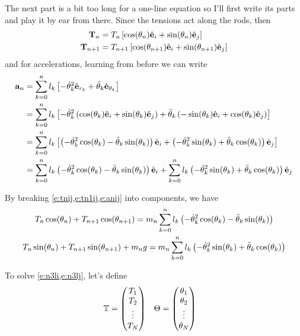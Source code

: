 \documentclass{article}
\begin{document}
The next part is a bit too long for a one-line equation so I'll first write its parts and play it by ear from there. Since the tensions act along the rods, then
\begin{align}
  \mathbf{T}_{n}&=T_{n}\left[\cos(\theta_n)\hat{\mathbf{e}}_i+\sin(\theta_n)\hat{\mathbf{e}}_j\right] \label{e:tnij}\\
  \mathbf{T}_{n+1}&=T_{n+1}\left[\cos(\theta_{n+1})\hat{\mathbf{e}}_i+\sin(\theta_{n+1})\hat{\mathbf{e}}_j\right] \label{e:tn1ij}
\end{align}
and for accelerations, learning from before we can write
\begin{align}
  \mathbf{a}_n&=\sum_{k=0}^{n}l_k\left[-\dot{\theta}_{k}^2\hat{\mathbf{e}}_{r_{k}}+\ddot{\theta}_{k}\hat{\mathbf{e}}_{\theta_{k}}\right]\notag\\
  &=\sum_{k=0}^{n}l_k\left[-\dot{\theta}_{k}^2\left(\cos(\theta_k)\hat{\mathbf{e}}_i+\sin(\theta_k)\hat{\mathbf{e}}_j\right)+\ddot{\theta}_{k}\left(-\sin(\theta_k)\hat{\mathbf{e}}_i+\cos(\theta_k)\hat{\mathbf{e}}_j\right)\right]\notag\\
  &=\sum_{k=0}^{n}l_k\left[\left(-\dot{\theta}_{k}^2\cos(\theta_k)-\ddot{\theta}_{k}\sin(\theta_k)\right)\hat{\mathbf{e}}_i+\left(-\dot{\theta}_{k}^2\sin(\theta_k)+\ddot{\theta}_{k}\cos(\theta_k)\right)\hat{\mathbf{e}}_j\right]\notag\\
  &=\sum_{k=0}^{n}l_k \left(-\dot{\theta}_{k}^2\cos(\theta_k)-\ddot{\theta}_{k}\sin(\theta_k)\right)\hat{\mathbf{e}}_i
  +
  \sum_{k=0}^{n}l_k \left(-\dot{\theta}_{k}^2\sin(\theta_k)+\ddot{\theta}_{k}\cos(\theta_k)\right)\hat{\mathbf{e}}_j \label{e:anij}
\end{align}

By breaking \cref{e:tnij,e:tn1ij,e:anij} into components, we have
\begin{gather}
  T_{n}\cos(\theta_{n})+T_{n+1}\cos(\theta_{n+1})
  =
  m_n\sum_{k=0}^n l_k \left(-\dot{\theta}_{k}^2\cos(\theta_k)-\ddot{\theta}_{k}\sin(\theta_k)\right)
  \label{e:n3li}
  \\
  T_{n}\sin(\theta_{n})+T_{n+1}\sin(\theta_{n+1})+m_ng
  =
  m_n\sum_{k=0}^{n}l_k \left(-\dot{\theta}_{k}^2\sin(\theta_k)+\ddot{\theta}_{k}\cos(\theta_k)\right)
  \label{e:n3lj}
\end{gather}

To solve \cref{e:n3li,e:n3lj}, let's define
\begin{align}
\mathbb{T}&=
\begin{pmatrix}
  T_{1}\\
  T_{2}\\
  \vdots\\
  T_{N}
\end{pmatrix} 
& 
\Theta&=
\begin{pmatrix}
  \theta_1\\
  \theta_2\\
  \vdots\\
  \theta_N
\end{pmatrix}
\end{align}
\end{document}
